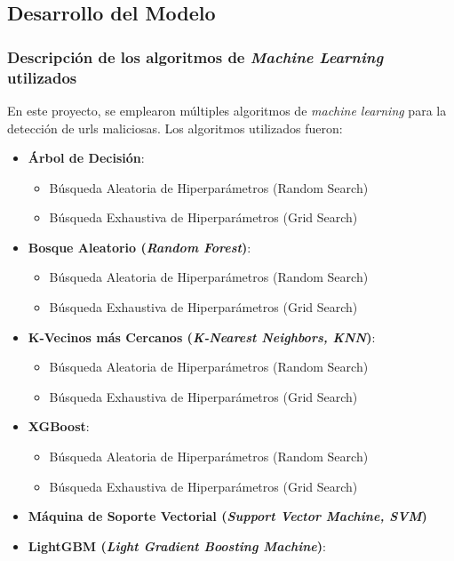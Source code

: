 \subsection{Desarrollo del Modelo}

\subsubsection*{Descripción de los algoritmos de \textit{Machine Learning} utilizados}
En este proyecto, se emplearon múltiples algoritmos de \textit{machine learning} para la detección de \glspl{url} maliciosas. Los algoritmos utilizados fueron:

\begin{itemize}
    \item \textbf{Árbol de Decisión}: 
    \begin{itemize}
        \item Búsqueda Aleatoria de Hiperparámetros (Random Search)
        \item Búsqueda Exhaustiva de Hiperparámetros (Grid Search)
    \end{itemize}
    \item \textbf{Bosque Aleatorio (\textit{Random Forest})}: 
    \begin{itemize}
        \item Búsqueda Aleatoria de Hiperparámetros (Random Search)
        \item Búsqueda Exhaustiva de Hiperparámetros (Grid Search)
    \end{itemize}
    \item \textbf{K-Vecinos más Cercanos (\textit{K-Nearest Neighbors, KNN})}: 
    \begin{itemize}
        \item Búsqueda Aleatoria de Hiperparámetros (Random Search)
        \item Búsqueda Exhaustiva de Hiperparámetros (Grid Search)
    \end{itemize}
    \item \textbf{XGBoost}: 
    \begin{itemize}
        \item Búsqueda Aleatoria de Hiperparámetros (Random Search)
        \item Búsqueda Exhaustiva de Hiperparámetros (Grid Search)
    \end{itemize}
    \item \textbf{Máquina de Soporte Vectorial (\textit{Support Vector Machine, SVM})}
    \item \textbf{LightGBM (\textit{Light Gradient Boosting Machine})}: 

\end{itemize}

